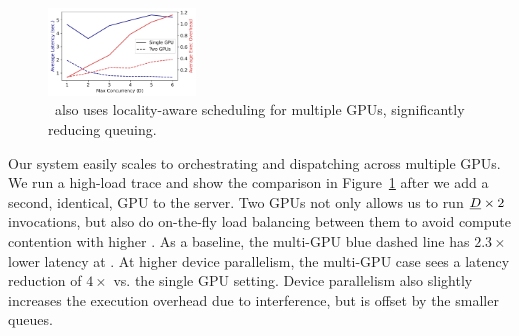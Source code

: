 \begin{figure}
  \centering  \includegraphics[width=0.35\textwidth]{../graphs/multi-gpu/25.7/concurr_scale.pdf}
  \vspace*{-8pt}
  \caption{\QName~also uses locality-aware scheduling for multiple GPUs, significantly reducing queuing.}
  \label{fig:multi-gpu}
  \vspace*{-8pt}
\end{figure}

Our system easily scales to orchestrating and dispatching across multiple GPUs.
We run a high-load trace and show the comparison in Figure~\ref{fig:multi-gpu} after we add a second, identical, GPU to the server. 
Two GPUs not only allows us to run $\emph{D}\times2$ invocations, but also do on-the-fly load balancing between them to avoid compute contention with higher \D. 
As a baseline, the multi-GPU blue dashed line has $2.3\times$ lower latency at .
At higher device parallelism, the multi-GPU case sees a latency reduction of $4\times$ vs. the single GPU setting. 
Device parallelism also slightly increases the execution overhead due to interference, but is offset by the smaller queues. 




